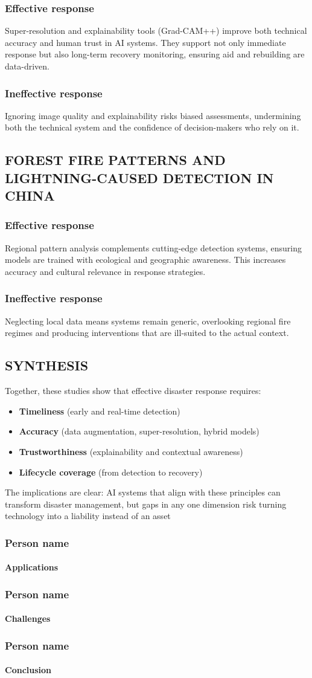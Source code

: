 \documentclass{beamer}
\newcommand{\namedframe}[3]{
  \begin{frame}
    \frametitle{#1}
    \framesubtitle{#2}
    #3
  \end{frame}
}
\begin{document}
{\subsubsection{Effective response}
Super-resolution and explainability tools (Grad-CAM++) improve both technical accuracy and human trust in AI systems. They support not only immediate response but also long-term recovery monitoring, ensuring aid and rebuilding are data-driven.

\subsubsection{Ineffective response}
Ignoring image quality and explainability risks biased assessments, undermining both the technical system and the confidence of decision-makers who rely on it.

\subsection{FOREST FIRE PATTERNS AND LIGHTNING-CAUSED DETECTION IN CHINA}
\subsubsection{Effective response}
Regional pattern analysis complements cutting-edge detection systems, ensuring models are trained with ecological and geographic awareness. This increases accuracy and cultural relevance in response strategies.

\subsubsection{Ineffective response}
Neglecting local data means systems remain generic, overlooking regional fire regimes and producing interventions that are ill-suited to the actual context.

\subsection{SYNTHESIS}
Together, these studies show that effective disaster response requires:
\begin{itemize}
    \item \textbf{Timeliness} (early and real-time detection)
    \item \textbf{Accuracy} (data augmentation, super-resolution, hybrid models)
    \item \textbf{Trustworthiness} (explainability and contextual awareness)
    \item \textbf{Lifecycle coverage} (from detection to recovery)
\end{itemize}
The implications are clear: AI systems that align with these principles can transform disaster management, but gaps in any one dimension risk turning technology into a liability instead of an asset
}

\namedframe{Person name}{Applications}{

}

\namedframe{Person name}{Challenges}{

}

\namedframe{Person name}{Conclusion}{

}
\end{document}
